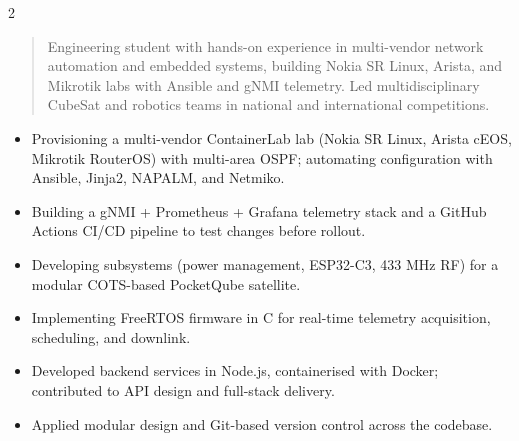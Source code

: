 \documentclass[10pt,a4paper,ragged2e,withhyper]{altacv}
\begin{document}
\begin{paracol}{2}

        \newpage

        \switchcolumn

            \begin{quote}
            Engineering student with hands-on experience in multi-vendor network automation and embedded systems, building Nokia SR Linux, Arista, and Mikrotik labs with Ansible and gNMI telemetry. Led multidisciplinary CubeSat and robotics teams in national and international competitions.
            \end{quote}

            \begin{itemize}
            \item Provisioning a multi-vendor ContainerLab lab (Nokia SR Linux, Arista cEOS, Mikrotik RouterOS) with multi-area OSPF; automating configuration with Ansible, Jinja2, NAPALM, and Netmiko.
            \item Building a gNMI + Prometheus + Grafana telemetry stack and a GitHub Actions CI/CD pipeline to test changes before rollout.
            \end{itemize}

            \begin{itemize}
            \item Developing subsystems (power management, ESP32-C3, 433 MHz RF) for a modular COTS-based PocketQube satellite.
            \item Implementing FreeRTOS firmware in C for real-time telemetry acquisition, scheduling, and downlink.
            \end{itemize}

            \begin{itemize}
                \item Developed backend services in Node.js, containerised with Docker; contributed to API design and full-stack delivery.
                \item Applied modular design and Git-based version control across the codebase.
            \end{itemize}
            \divider


\end{paracol}
\end{document}
